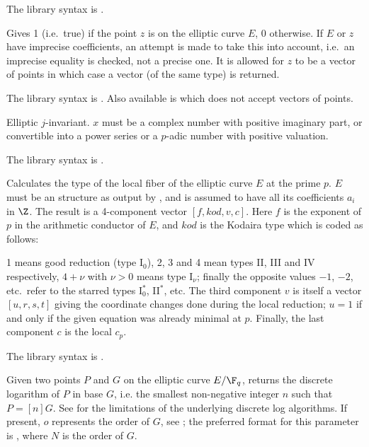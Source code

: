 The library syntax is .

\label{se:ellisoncurve}
Gives 1 (i.e.~true) if the point $z$ is on the elliptic curve $E$, 0
otherwise. If $E$ or $z$ have imprecise coefficients, an attempt is made to
take this into account, i.e.~an imprecise equality is checked, not a precise
one. It is allowed for $z$ to be a vector of points in which case a vector
(of the same type) is returned.

The library syntax is .
Also available is  which does not
accept vectors of points.

\label{se:ellj}
Elliptic $j$-invariant. $x$ must be a complex number
with positive imaginary part, or convertible into a power series or a
$p$-adic number with positive valuation.

The library syntax is .

\label{se:elllocalred}
Calculates the  type of the local fiber of the elliptic curve
$E$ at the prime $p$. $E$ must be an  structure as output by
, and is assumed to have all its coefficients $a_i$ in $\Z$.
The result is a 4-component vector $[f,kod,v,c]$. Here $f$ is the exponent of
$p$ in the arithmetic conductor of $E$, and $kod$ is the Kodaira type which
is coded as follows:

1 means good reduction (type I$_0$), 2, 3 and 4 mean types II, III and IV
respectively, $4+\nu$ with $\nu>0$ means type I$_\nu$;
finally the opposite values $-1$, $-2$, etc.~refer to the starred types
I$_0^*$, II$^*$, etc. The third component $v$ is itself a vector $[u,r,s,t]$
giving the coordinate changes done during the local reduction;
$u = 1$ if and only if the given equation was already minimal at $p$.
Finally, the last component $c$ is the local  $c_p$.

The library syntax is .

\label{se:elllog}
Given two points $P$ and $G$ on the elliptic curve $E/\F_q$, returns the
discrete logarithm of $P$ in base $G$, i.e. the smallest non-negative
integer $n$ such that $P = [n]G$.
See  for the limitations of the underlying discrete log algorithms.
If present, $o$ represents the order of $G$, see ;
the preferred format for this parameter is \kbd{[N, factor(N)]}, where $N$
is  the order of $G$.

